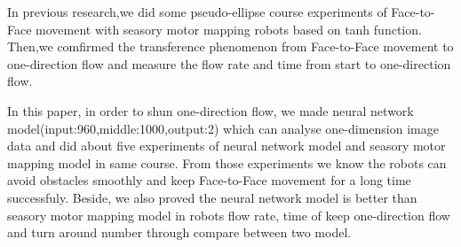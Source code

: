 
In previous research,we did some pseudo-ellipse course experiments of Face-to-Face movement with seasory motor mapping robots based on tanh function.
Then,we comfirmed the transference phenomenon from Face-to-Face movement to one-direction flow and measure the flow rate and time from start to one-direction flow.

In this paper, in order to shun one-direction flow, we made neural network model(input:960,middle:1000,output:2) which can analyse one-dimension image data and
did about five experiments of  neural network model and seasory motor mapping model in same course. 
From those experiments we know the robots can avoid obstacles smoothly and keep Face-to-Face movement for a long time successfuly.
Beside, we also proved the neural network model is better than seasory motor mapping model in robots flow rate, time of keep one-direction flow and turn around number through compare between two model.

 

